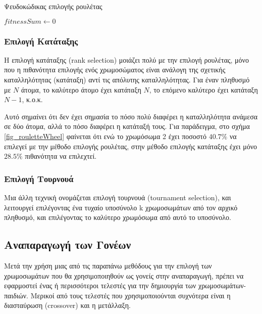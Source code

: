 \begin{algorithm}[!t]
    \caption{Ψευδοκώδικας επιλογής ρουλέτας}
    \label{algo_rouletteWheel}
    $fitnessSum \gets 0$\;
    \;
\end{algorithm}

\subsubsection{Επιλογή Κατάταξης}

Η επιλογή κατάταξης (rank selec\-tion) μοιάζει πολύ με την επιλογή ρουλέτας, μόνο που η πιθανότητα επιλογής ενός χρωμοσώματος είναι ανάλογη της σχετικής καταλληλότητας (κατάταξη) αντί τις απόλυτης καταλληλότητας. Για έναν πληθυσμό με $N$ άτομα, το καλύτερο άτομο έχει κατάταξη $N$, το επόμενο καλύτερο έχει κατάταξη $N-1$, κ.ο.κ. \cite{manlio2014}

Αυτό σημαίνει ότι δεν έχει σημασία το πόσο πολύ διαφέρει η καταλληλότητα ανάμεσα σε δύο άτομα, αλλά το πόσο διαφέρει η κατάταξή τους. Για παράδειγμα, στο σχήμα \ref{fig_rouletteWheel} φαίνεται ότι ενώ το χρωμόσωμα 2 έχει ποσοστό $40.7\%$ να επιλεγεί με την μέθοδο επιλογής ρουλέτας, στην μέθοδο επιλογής κατάταξης έχει μόνο $28.5\%$ πιθανότητα να επιλεχτεί.

\subsubsection{Επιλογή Τουρνουά}

Μια άλλη τεχνική ονομάζεται επιλογή τουρνουά (tournament selection), και λειτουργεί επιλέγοντας ένα τυχαίο υποσύνολο k χρωμοσωμάτων από τον αρχικό πληθυσμό, και επιλέγοντας το καλύτερο χρωμόσωμα από αυτό το υποσύνολο.

\subsection{Αναπαραγωγή των Γονέων}

Μετά την χρήση μιας από τις παραπάνω μεθόδους για την επιλογή των χρωμοσωμάτων που θα χρησιμοποιηθούν ως γονείς στην αναπαραγωγή, πρέπει να εφαρμοστεί ένας ή περισσότεροι τελεστές για την δημιουργία των χρωμοσωμάτων-παιδιών. Μερικοί από τους τελεστές που χρησιμοποιούνται συχνότερα είναι η διασταύρωση (crossover) και η μετάλλαξη.

